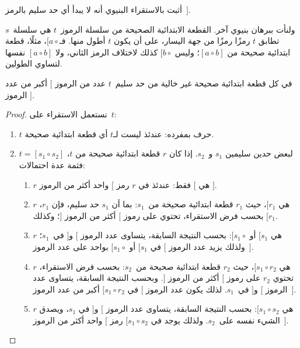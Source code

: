 \documentclass[../../../include/open-logic-section]{subfiles}
\begin{document}
\begin{prob}
  أثبت بالاستقراء البنيوي أنه لا يبدأ أي حد سليم بالرمز~$]$.
\end{prob}

ولنأت ببرهان بنيوي آخر. القطعة الابتدائية الصحيحة من سلسلة الرموز~$t$
هي سلسلة~$s$ تطابق $t$ رمزًا رمزًا من جهة اليسار، على أن يكون $t$
أطول منها. فـ$[a \circ {}$، مثلًا، قطعة ابتدائية صحيحة من
$[a \circ b]$؛ وليس $[b \circ {}$ كذلك لاختلاف الرمز الثاني، ولا
$[a \circ b]$ نفسها لتساوي الطولين.

\begin{prop}
  في كل قطعة ابتدائية صحيحة غير خالية من حد سليم~$t$ عدد من الرموز $[$ أكبر من
  عدد الرموز $]$.
\end{prop}

\begin{proof}
  نستعمل الاستقراء على~$t$:
  \begin{enumerate}
  \item $t$ حرف بمفرده: عندئذ ليست لـ$t$ أي قطعة ابتدائية صحيحة.
  \item $t = [s_1 \circ s_2]$ لبعض حدين سليمين $s_1$ و~$s_2$. إذا
    كان $r$ قطعة ابتدائية صحيحة من $t$، فثمة عدة احتمالات:
    \begin{enumerate}
    \item $r$ هي $[$ فقط: عندئذ في $r$ رمز $[$ واحد أكثر من الرموز
      $]$.
    \item $r$ هي $[r_1$، حيث $r_1$ قطعة ابتدائية صحيحة من~$s_1$:
      بما أن $s_1$ حد سليم، فإن $r_1$، بحسب فرض الاستقراء، تحتوي على
      رموز $[$ أكثر من الرموز $]$؛ وكذلك $[r_1$.
    \item $r$ هي $[s_1$ أو $[s_1 \circ {}$: بحسب النتيجة السابقة،
      يتساوى عدد الرموز $[$ و$]$ في~$s_1$؛ ولذلك يزيد عدد الرموز $[$
      في $[s_1$ أو $[s_1 \circ {}$ بواحد على عدد الرموز~$]$.
    \item $r$ هي $[s_1 \circ r_2$، حيث $r_2$ قطعة ابتدائية صحيحة
      من~$s_2$: بحسب فرض الاستقراء، تحتوي $r_2$ على رموز $[$ أكثر من
      الرموز $]$. وبحسب النتيجة السابقة، يتساوى عدد الرموز $[$ و$]$
      في~$s_1$. لذلك يكون عدد الرموز $[$ في $[s_1 \circ r_2$ أكبر من
      عدد الرموز~$]$.
    \item $r$ هي $[s_1 \circ s_2$: بحسب النتيجة السابقة، يتساوى عدد
      الرموز $[$ و$]$ في $s_1$، ويصدق الشيء نفسه على~$s_2$. ولذلك
      يوجد في $[s_1 \circ s_2$ رمز $[$ واحد أكثر من الرموز~$]$.
    \end{enumerate}
  \end{enumerate}
\end{proof}
\end{document}
